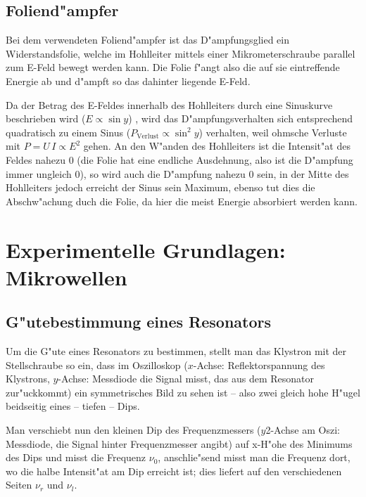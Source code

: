 \documentclass[a4paper,12pt]{article}
\begin{document}
\subsection{Foliend"ampfer}

Bei dem verwendeten Foliend"ampfer ist das D"ampfungsglied ein
Widerstandsfolie, welche im Hohlleiter mittels einer
Mikrometerschraube parallel zum E-Feld bewegt werden kann. Die Folie
f"angt also die auf sie eintreffende Energie ab und d"ampft so das
dahinter liegende E-Feld.  

Da der Betrag des E-Feldes innerhalb des Hohlleiters durch eine
Sinuskurve beschrieben wird ($E \propto \sin y$) , wird das
D"ampfungsverhalten sich entsprechend quadratisch zu einem Sinus
($P_\text{Verlust} \propto \sin^2 y$) verhalten, weil ohmsche Verluste
mit $P = U \, I \propto E^2$ gehen.  An den W"anden des Hohlleiters
ist die Intensit"at des Feldes nahezu 0 (die Folie hat eine endliche
Ausdehnung, also ist die D"ampfung immer ungleich 0), so wird auch die
D"ampfung nahezu 0 sein, in der Mitte des Hohlleiters jedoch erreicht
der Sinus sein Maximum, ebenso tut dies die Abschw"achung duch die
Folie, da hier die meist Energie absorbiert werden kann.



\section{Experimentelle Grundlagen: Mikrowellen}
\label{sec:exper_grundl_mikr}





\subsection{G"utebestimmung eines Resonators}
\label{sec:gutebestimmung_eines_resonators}

Um die G"ute eines Resonators zu bestimmen, stellt man das Klystron mit der
Stellschraube so ein, dass im Oszilloskop ($x$-Achse: Reflektorspannung des Klystrons, $y$-Achse: Messdiode die Signal misst, das aus dem Resonator
zur"uckkommt) ein symmetrisches Bild zu sehen ist -- also zwei gleich hohe
H"ugel beidseitig eines -- tiefen -- Dips.

Man verschiebt nun den kleinen Dip des Frequenzmessers ($y$2-Achse am
Oszi: Messdiode, die Signal hinter Frequenzmesser angibt) auf x-H"ohe des
Minimums des Dips und misst die Frequenz $\nu_0$, anschlie"send misst man die
Frequenz dort, wo die halbe Intensit"at am Dip erreicht ist; dies liefert auf
den verschiedenen Seiten $\nu_r$ und $\nu_l$. 
\end{document}
